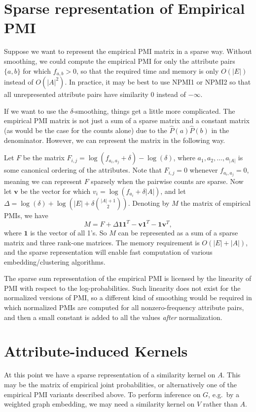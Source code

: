 \documentclass[11pt, oneside, fleqn]{article}   	%
\theoremstyle{plain}
\begin{document}
\section{Sparse representation of Empirical PMI}
Suppose we want to represent the empirical PMI matrix in a sparse way.  Without smoothing, we could compute the empirical PMI for only the attribute pairs $\{a, b\}$ for which $f_{a,b} > 0$, so that the required time and memory is only $O(|E|)$ instead of $O(|A|^2)$.  In practice, it may be best to use NPMI1 or NPMI2 so that all unrepresented attribute pairs have similarity 0 instead of $-\infty$.

If we want to use the $\delta$-smoothing, things get a little more complicated.  The empirical PMI matrix is not just a sum of a sparse matrix and a constant matrix (as would be the case for the counts alone) due to the $\hat{P}(a) \hat{P}(b)$ in the denominator.  However, we can represent the matrix in the following way.

Let $F$ be the matrix $F_{i,j} = \log(f_{a_i,a_j} + \delta) - \log(\delta)$, where $a_1, a_2, \ldots, a_{|A|}$ is some canonical ordering of the attributes.  Note that $F_{i,j} = 0$ whenever $f_{a_i,a_j} = 0$, meaning we can represent $F$ sparsely when the pairwise counts are sparse.  Now let $\textbf{v}$ be the vector for which $v_i = \log(f_{a_i} + \delta |A|)$, and let $\Delta = \log(\delta) + \log(|E| + \delta \binom{|A| + 1}{2})$.  Denoting by $M$ the matrix of empirical PMIs, we have
$$ M = F + \Delta \mathbf{1} \mathbf{1}^T - \mathbf{v} \mathbf{1}^T - \mathbf{1} \mathbf{v}^T, $$
where $\mathbf{1}$ is the vector of all 1's.  So $M$ can be represented as a sum of a sparse matrix and three rank-one matrices.  The memory requirement is $O(|E| + |A|)$, and the sparse representation will enable fast computation of various embedding/clustering algorithms.

The sparse sum representation of the empirical PMI is licensed by the linearity of PMI with respect to the log-probabilities.  Such linearity does not exist for the normalized versions of PMI, so a different kind of smoothing would be required in which normalized PMIs are computed for all nonzero-frequency attribute pairs, and then a small constant is added to all the values \textit{after} normalization.

\section{Attribute-induced Kernels}
At this point we have a sparse representation of a similarity kernel on $A$.  This may be the matrix of empirical joint probabilities, or alternatively one of the empirical PMI variants described above.  To perform inference on $G$, e.g.\ by a weighted graph embedding, we may need a similarity kernel on $V$ rather than $A$.  
\end{document}
